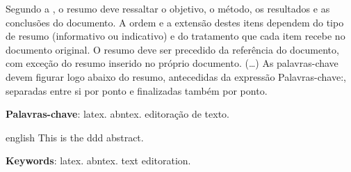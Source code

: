 \setlength{\absparsep}{18pt} %
\begin{resumo}
    Segundo a , o resumo deve ressaltar o
    objetivo, o método, os resultados e as conclusões do documento. A ordem e a extensão
    destes itens dependem do tipo de resumo (informativo ou indicativo) e do
    tratamento que cada item recebe no documento original. O resumo deve ser
    precedido da referência do documento, com exceção do resumo inserido no
    próprio documento. (\ldots) As palavras-chave devem figurar logo abaixo do
    resumo, antecedidas da expressão Palavras-chave:, separadas entre si por
    ponto e finalizadas também por ponto.

    \textbf{Palavras-chave}: latex. abntex. editoração de texto.
\end{resumo}

\begin{resumo}[Abstract]
    \begin{otherlanguage*}{english}
        This is the ddd abstract.

        \vspace{\onelineskip}

        \noindent 
        \textbf{Keywords}: latex. abntex. text editoration.
    \end{otherlanguage*}
\end{resumo}